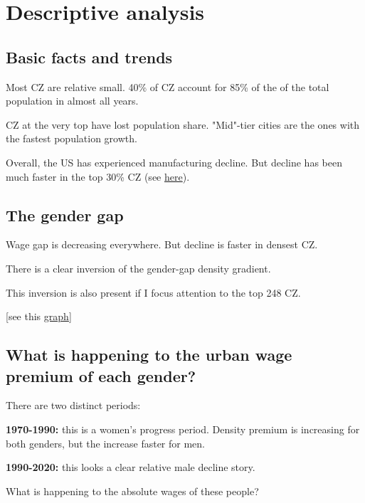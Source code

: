 \section{Descriptive analysis}
\subsection{Basic facts and trends}
\bitem
\item Most CZ are relative small. 40\% of CZ account for 85\% of the of the total population in almost all years.
\item CZ at the very top have lost population share. "Mid"-tier cities are the ones with the fastest population growth.
\item Overall, the US has experienced manufacturing decline. But decline has been much faster in the top 30\% CZ (see \href{https://www.dropbox.com/s/cp9v7uk87lyij4r/bar_deciles_manufacturing.png?dl=0}{here}).
\item 

\eitem

\subsection{The gender gap}
\bitem
\item Wage gap is decreasing everywhere. But decline is faster in densest CZ.
\item There is a clear inversion of the gender-gap density gradient. 
\item This inversion is also present if I focus attention to the top 248 CZ. 

[see this \href{https://www.dropbox.com/s/yytq0djtbb8lb5i/bar_graph_deviation_from_mean.png?dl=0}{graph}]

\item
\eitem
\subsection{What is happening to the urban wage premium of each gender?}
There are two distinct periods:
\bitem
	\item \textbf{1970-1990:} this is a women's progress period. Density premium is increasing for both genders, but the increase faster for men.
	\item \textbf{1990-2020:} this looks a clear relative male decline story.
\eitem

What is happening to the absolute wages of these people?

